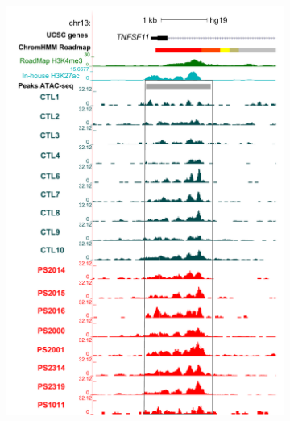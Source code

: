 \begin{figure}[htbp]
\centering
\begin{subfigure}{0.45\textwidth}
\centering
\includegraphics[width=\textwidth]{./Results2/pdfs/UCSC_ATAC_CD8_peak_prom_TNFSF11}
\caption{\textbf{}}
\end{subfigure}%
\begin{subfigure}{0.45\textwidth}
\centering

\end{subfigure}
\end{figure}
